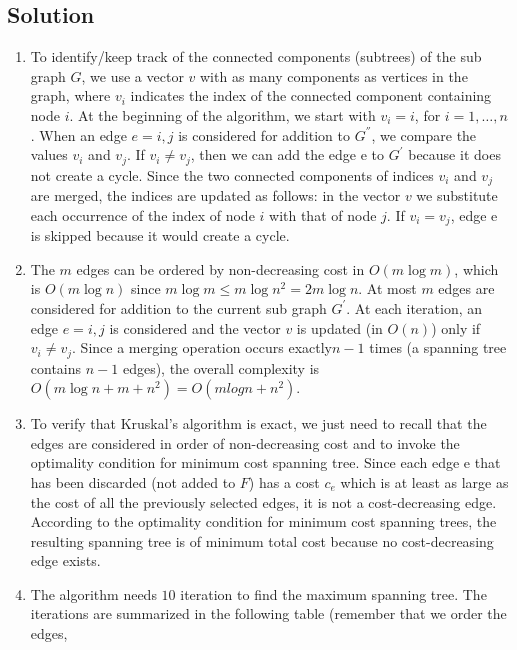 \documentclass[12pt, a4paper]{report}
\begin{document}
    \subsection*{Solution}
        \begin{enumerate}
            \item To identify/keep track of the connected components (subtrees) of the sub graph $G$, we use a vector $v$ with as many components as vertices in the graph, 
                where $v_i$ indicates the index of the connected component containing node $i$. At the beginning of the algorithm, we start with $v_i=i$, for $i = 1,\dots,n$. 
                When an edge $e = {i,j}$ is considered for addition to $G^{''}$, we compare the values $v_i$ and $v_j$. If $v_i \neq v_j$, then we can add the edge e to $G^{'}$ 
                because it does not create a cycle. Since the two connected components of indices $v_i$ and $v_j$ are merged, the indices are updated as follows: in the vector $v$
                we substitute each occurrence of the index of node $i$ with that of node $j$. If $v_i = v_j$, edge e is skipped because it would create a cycle. 
            \item The $m$ edges can be ordered by non-decreasing cost in $O(m\log m)$, which is $O(m \log n)$ since $m\log m \leq m\log n^2 = 2m\log n$. At most $m$ edges are 
                considered for addition to the current sub graph $G^{'}$. At each iteration, an edge $e = {i,j}$ is considered and the vector $v$ is updated (in $O(n)$) only if 
                $v_i \neq v_j$. Since a merging operation occurs exactly$ n-1$ times (a spanning tree contains $n-1$ edges), the overall complexity is $O(m\log n + m+n^2)=
                O(mlogn + n^2)$. 
            \item To verify that Kruskal's algorithm is exact, we just need to recall that the edges are considered in order of non-decreasing cost and to invoke the 
                optimality condition for minimum cost spanning tree. Since each edge e that has been discarded (not added to $F$) has a cost $c_e$ which is at least as large as 
                the cost of all the previously selected edges, it is not a cost-decreasing edge. According to the optimality condition for minimum cost spanning trees, the 
                resulting spanning tree is of minimum total cost because no cost-decreasing edge exists. 
            \item The algorithm needs $10$ iteration to find the maximum spanning tree. The iterations are summarized in the following table (remember that we order the edges,

\end{enumerate}
\end{document}
